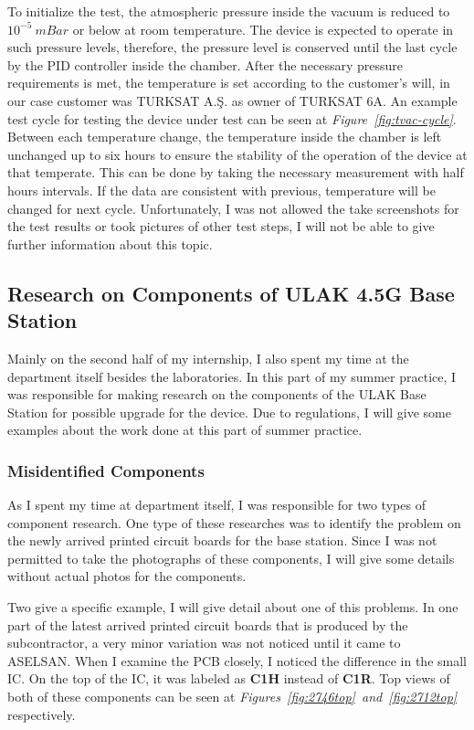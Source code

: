 	 To initialize the test, the atmospheric pressure inside the vacuum is reduced to $10^{-5}~mBar$ or below at room temperature. The device is expected to operate in such pressure levels, therefore, the pressure level is conserved until the last cycle by the PID controller inside the chamber. After the necessary pressure requirements is met, the temperature is set according to the customer's will, in our case customer was TURKSAT A.Ş. as owner of TURKSAT 6A. An example test cycle for testing the device under test can be seen at \textit{Figure~\ref{fig:tvac-cycle}}. Between each temperature change, the temperature inside the chamber is left unchanged up to six hours to ensure the stability of the operation of the device at that temperate. This can be done by taking the necessary measurement with half hours intervals. If the data are consistent with previous, temperature will be changed for next cycle. Unfortunately, I was not allowed the take screenshots for the test results or took pictures of other test steps,  I will not be able to give further information about this topic.
		

\subsection{Research on Components of ULAK 4.5G Base Station  }
\- \indent
	Mainly on the second half of my internship, I also spent my time at the department itself besides the laboratories. In this part of my summer practice, I was responsible for making research on the components of the ULAK Base Station for possible upgrade for the device. Due to regulations, I will give some examples about the work done at this part of summer practice. 


\subsubsection{Misidentified Components}
\- \indent
	As I spent my time at department itself, I was responsible for two types of component research. One type of these researches was to identify the problem on the newly arrived printed circuit boards for the base station. Since I was not permitted to take the photographs of these components, I will give some details without actual photos for the components. 	
	
	Two give a specific example, I will give detail about one of this problems. In one part of the latest arrived printed circuit boards that is produced by the subcontractor, a very minor variation was not noticed until it came to ASELSAN. When I examine the PCB closely, I noticed the difference in the small IC. On the top of the IC, it was labeled as \textbf{C1H} instead of \textbf{C1R}. Top views of both of these components can be seen at \textit{Figures~\ref{fig:2746top}~and~\ref{fig:2712top}} respectively.  
	 

